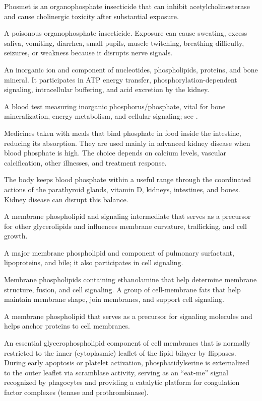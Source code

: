 Phosmet is an organophosphate insecticide that can inhibit acetylcholinesterase and cause cholinergic toxicity after substantial exposure.

 A poisonous organophosphate insecticide. Exposure can cause sweating, excess saliva, vomiting, diarrhea, small pupils, muscle twitching, breathing difficulty, seizures, or weakness because it disrupts nerve signals.

 An inorganic ion and component of nucleotides, phospholipids, proteins, and bone mineral. It participates in ATP energy transfer, phosphorylation-dependent signaling, intracellular buffering, and acid excretion by the kidney.

 A blood test measuring inorganic phosphorus/phosphate, vital for bone mineralization, energy metabolism, and cellular signaling; see .

 Medicines taken with meals that bind phosphate in food inside the intestine, reducing its absorption. They are used mainly in advanced kidney disease when blood phosphate is high. The choice depends on calcium levels, vascular calcification, other illnesses, and treatment response.

 The body keeps blood phosphate within a useful range through the coordinated actions of the parathyroid glands, vitamin D, kidneys, intestines, and bones. Kidney disease can disrupt this balance.

 A membrane phospholipid and signaling intermediate that serves as a precursor for other glycerolipids and influences membrane curvature, trafficking, and cell growth.

 A major membrane phospholipid and component of pulmonary surfactant, lipoproteins, and bile; it also participates in cell signaling.

 Membrane phospholipids containing ethanolamine that help determine membrane structure, fusion, and cell signaling. A group of cell-membrane fats that help maintain membrane shape, join membranes, and support cell signaling.

 A membrane phospholipid that serves as a precursor for signaling molecules and helps anchor proteins to cell membranes.

 An essential glycerophospholipid component of cell membranes that is normally restricted to the inner (cytoplasmic) leaflet of the lipid bilayer by flippases. During early apoptosis or platelet activation, phosphatidylserine is externalized to the outer leaflet via scramblase activity, serving as an ``eat-me'' signal recognized by phagocytes and providing a catalytic platform for coagulation factor complexes (tenase and prothrombinase).

